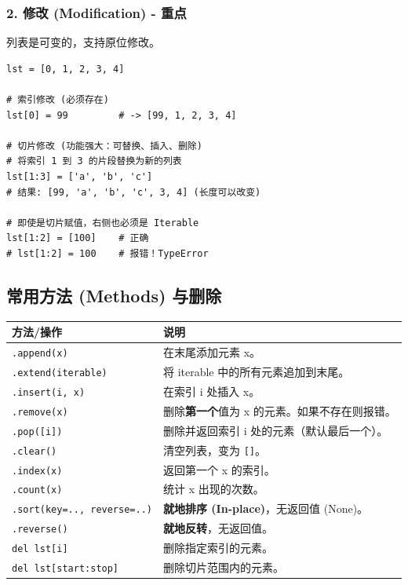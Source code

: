 \documentclass[12pt, a4paper]{article}
\begin{document}
\subsubsection{2. 修改 (Modification) - 重点}
列表是可变的，支持原位修改。

\begin{lstlisting}[caption={索引修改 vs 切片修改}]
lst = [0, 1, 2, 3, 4]

# 索引修改 (必须存在)
lst[0] = 99         # -> [99, 1, 2, 3, 4]

# 切片修改 (功能强大：可替换、插入、删除)
# 将索引 1 到 3 的片段替换为新的列表
lst[1:3] = ['a', 'b', 'c'] 
# 结果: [99, 'a', 'b', 'c', 3, 4] (长度可以改变)

# 即使是切片赋值，右侧也必须是 Iterable
lst[1:2] = [100]    # 正确
# lst[1:2] = 100    # 报错！TypeError
\end{lstlisting}

\subsection{常用方法 (Methods) 与删除}

\begin{longtable}{p{4cm} p{10cm}}
\toprule
\textbf{方法/操作} & \textbf{说明} \\
\midrule
\texttt{.append(x)} & 在末尾添加元素 x。 \\
\texttt{.extend(iterable)} & 将 iterable 中的所有元素追加到末尾。 \\
\texttt{.insert(i, x)} & 在索引 i 处插入 x。 \\
\texttt{.remove(x)} & 删除\textbf{第一个}值为 x 的元素。如果不存在则报错。 \\
\texttt{.pop([i])} & 删除并返回索引 i 处的元素（默认最后一个）。 \\
\texttt{.clear()} & 清空列表，变为 \texttt{[]}。 \\
\texttt{.index(x)} & 返回第一个 x 的索引。 \\
\texttt{.count(x)} & 统计 x 出现的次数。 \\
\texttt{.sort(key=.., reverse=..)} & \textbf{就地排序 (In-place)}，无返回值 (None)。 \\
\texttt{.reverse()} & \textbf{就地反转}，无返回值。 \\
\texttt{del lst[i]} & 删除指定索引的元素。 \\
\texttt{del lst[start:stop]} & 删除切片范围内的元素。 \\
\bottomrule
\end{longtable}
\end{document}
